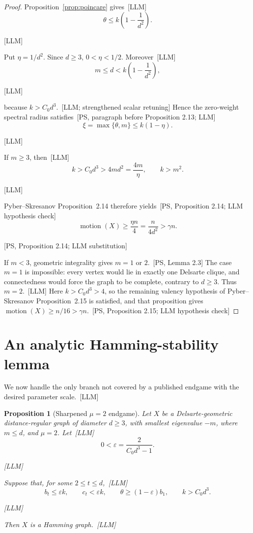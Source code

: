 \documentclass[10pt]{amsart}
\newtheorem{proposition}[theorem]{Proposition}
\theoremstyle{remark}
\DeclareMathOperator{\motion}{motion}
\newcommand{\eps}{\varepsilon}
\newcommand{\prov}[1]{\unskip\, {\normalfont\scriptsize\color{provgray}\textsf{[#1]}}}
\newcommand{\eqprov}[1]{%
  \par\nobreak\vspace{-0.68\baselineskip}%
  \noindent\hfill{\normalfont\scriptsize\color{provgray}\textsf{[#1]}}%
  \par\vspace{0.20\baselineskip}%
}
\begin{document}
\begin{proof}
Proposition~\ref{prop:poincare} gives\prov{LLM}
\[
\theta\le k\left(1-\frac1{d^2}\right).
\]
\eqprov{LLM}
Put $\eta=1/d^2$. Since $d\ge3$, $0<\eta<1/2$. Moreover\prov{LLM}
\[
m\le d<k\left(1-\frac1{d^2}\right),
\]
\eqprov{LLM}
because $k>C_0d^3$.\prov{LLM; strengthened scalar retuning} Hence the zero-weight spectral radius satisfies\prov{PS, paragraph before Proposition 2.13; LLM}
\[
\xi=\max\{\theta,m\}\le k(1-\eta).
\]
\eqprov{LLM}
If $m\ge3$, then\prov{LLM}
\[
k>C_0d^3>4md^2=\frac{4m}{\eta},
\qquad k>m^2.
\]
\eqprov{LLM}
Pyber--Skresanov Proposition~2.14 therefore yields\prov{PS, Proposition 2.14; LLM hypothesis check}
\[
\motion(X)\ge\frac{\eta n}{4}=\frac{n}{4d^2}>\gamma n.
\]
\eqprov{PS, Proposition 2.14; LLM substitution}

If $m<3$, geometric integrality gives $m=1$ or $2$.\prov{PS, Lemma 2.3} The case $m=1$ is impossible: every vertex would lie in exactly one Delsarte clique, and connectedness would force the graph to be complete, contrary to $d\ge3$. Thus $m=2$.\prov{LLM} Here $k>C_0d^3>4$, so the remaining valency hypothesis of Pyber--Skresanov Proposition~2.15 is satisfied, and that proposition gives $\motion(X)\ge n/16>\gamma n$.\prov{PS, Proposition 2.15; LLM hypothesis check}
\end{proof}

\section{An analytic Hamming-stability lemma}
We now handle the only branch not covered by a published endgame with the desired parameter scale.\prov{LLM}

\begin{proposition}[Sharpened $\mu=2$ endgame]\label{prop:hamming}
Let $X$ be a Delsarte-geometric distance-regular graph of diameter $d\ge3$, with smallest eigenvalue $-m$, where $m\le d$, and $\mu=2$. Let\prov{LLM}
\[
0<\eps=\frac{2}{C_0d^3-1}.
\]
\eqprov{LLM}
Suppose that, for some $2\le t\le d$,\prov{LLM}
\begin{equation}
b_t\le\eps k,\qquad c_t<\eps k,\qquad \theta\ge(1-\eps)b_1,
\qquad k>C_0d^3.
\end{equation}
\eqprov{LLM}
Then $X$ is a Hamming graph.\prov{LLM}
\end{proposition}
\end{document}
